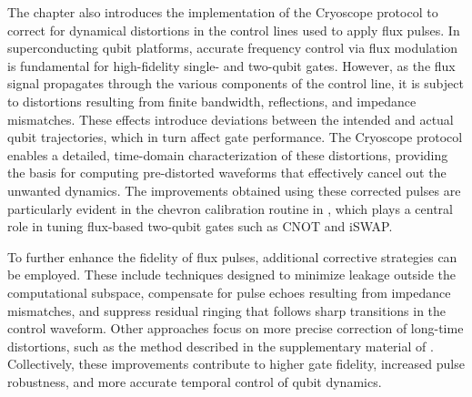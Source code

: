 The chapter also introduces the implementation of the Cryoscope protocol to correct for dynamical distortions in the control lines used to apply flux pulses. 
In superconducting qubit platforms, accurate frequency control via flux modulation is fundamental for high-fidelity single- and two-qubit gates. 
However, as the flux signal propagates through the various components of the control line, it is subject to distortions resulting from finite bandwidth, reflections, and impedance mismatches. 
These effects introduce deviations between the intended and actual qubit trajectories, which in turn affect gate performance. 
The Cryoscope protocol enables a detailed, time-domain characterization of these distortions, providing the basis for computing pre-distorted waveforms that effectively cancel out the unwanted dynamics. 
The improvements obtained using these corrected pulses are particularly evident in the chevron calibration routine in \Qibocal, which plays a central role in tuning flux-based two-qubit gates such as CNOT and iSWAP.

To further enhance the fidelity of flux pulses, additional corrective strategies can be employed. 
These include techniques designed to minimize leakage outside the computational subspace, compensate for pulse echoes resulting from impedance mismatches, and suppress residual ringing that follows sharp transitions in the control waveform. 
Other approaches focus on more precise correction of long-time distortions, such as the method described in the supplementary material of \cite{Ma_2019}. 
Collectively, these improvements contribute to higher gate fidelity, increased pulse robustness, and more accurate temporal control of qubit dynamics.